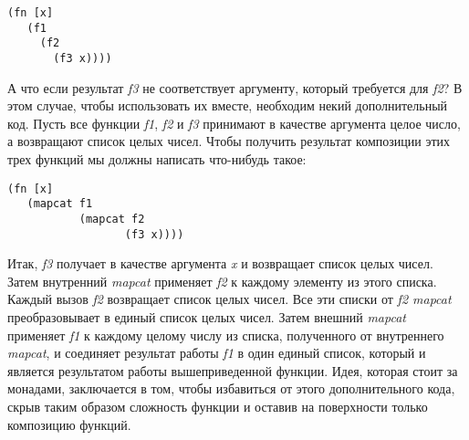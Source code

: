 \documentclass[a4paper,12pt]{article}
\newcommand{\cl}[1] {{\it #1}}
\begin{document}
\begin{verbatim}
(fn [x]
   (f1
     (f2
       (f3 x))))
\end{verbatim}

А что если результат \cl{f3} не соответствует аргументу, который требуется для \cl{f2}? В этом случае,
чтобы использовать их вместе, необходим некий дополнительный код. Пусть все функции \cl{f1}, \cl{f2} и \cl{f3} 
принимают в качестве аргумента целое число, а возвращают список целых чисел. Чтобы получить результат
композиции этих трех функций мы должны написать что-нибудь такое: 

\begin{verbatim}
(fn [x]
   (mapcat f1
           (mapcat f2
                  (f3 x))))
\end{verbatim}

Итак, \cl{f3} получает в качестве аргумента \cl{x} и возвращает список целых чисел. Затем внутренний
\cl{mapcat} применяет \cl{f2} к каждому элементу из этого списка. Каждый вызов \cl{f2} возвращает список целых
чисел. Все эти списки от \cl{f2 mapcat} преобразовывает в единый список целых чисел. Затем внешний
\cl{mapcat} применяет \cl{f1} к каждому целому числу из списка, полученного от внутреннего \cl{mapcat}, и
соединяет результат работы \cl{f1} в один единый список, который и является результатом работы
вышеприведенной функции. Идея, которая стоит за монадами, заключается в том, чтобы избавиться
от этого дополнительного кода, скрыв таким образом сложность функции и оставив на поверхности только 
композицию функций.


\end{document}
